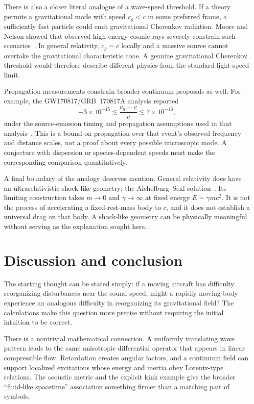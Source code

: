 \documentclass[11pt,a4paper]{article}
\numberwithin{equation}{section}
\begin{document}
There is also a closer literal analogue of a wave-speed threshold. If a theory permits a gravitational mode with speed $c_g<c$ in some preferred frame, a sufficiently fast particle could emit gravitational Cherenkov radiation. Moore and Nelson showed that observed high-energy cosmic rays severely constrain such scenarios~\cite{moore}. In general relativity, $c_g=c$ locally and a massive source cannot overtake the gravitational characteristic cone. A genuine gravitational Cherenkov threshold would therefore describe different physics from the standard light-speed limit.

Propagation measurements constrain broader continuum proposals as well. For example, the GW170817/GRB~170817A analysis reported
\begin{equation}
 -3\times10^{-15}\lesssim\frac{c_g-c}{c}
 \lesssim7\times10^{-16},
\end{equation}
under the source-emission timing and propagation assumptions used in that analysis~\cite{abbott}. This is a bound on propagation over that event's observed frequency and distance scales, not a proof about every possible microscopic mode. A conjecture with dispersion or species-dependent speeds must make the corresponding comparison quantitatively.

A final boundary of the analogy deserves mention. General relativity does have an ultrarelativistic shock-like geometry: the Aichelburg--Sexl solution~\cite{aichelburg}. Its limiting construction takes $m\to0$ and $\gamma\to\infty$ at fixed energy $E=\gamma mc^2$. It is not the process of accelerating a fixed-rest-mass body to $c$, and it does not establish a universal drag on that body. A shock-like geometry can be physically meaningful without serving as the explanation sought here.

\section{Discussion and conclusion}

The starting thought can be stated simply: if a moving aircraft has difficulty reorganizing disturbances near the sound speed, might a rapidly moving body experience an analogous difficulty in reorganizing its gravitational field? The calculations make this question more precise without requiring the initial intuition to be correct.

There is a nontrivial mathematical connection. A uniformly translating wave pattern leads to the same anisotropic differential operator that appears in linear compressible flow. Retardation creates angular factors, and a continuum field can support localized excitations whose energy and inertia obey Lorentz-type relations. The acoustic metric and the explicit kink example give the broader ``fluid-like spacetime'' association something firmer than a matching pair of symbols.
\end{document}
